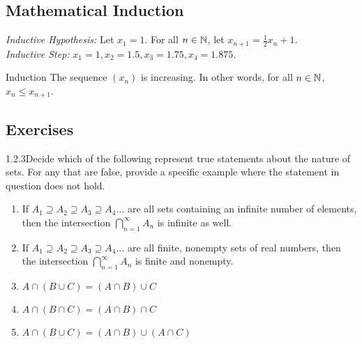 \subsection{Mathematical Induction} \hfill

\textit{Inductive Hypothesis:} Let $x_1 = 1$. For all $n \in \mathbb{N}$, let $x_{n+1} = \frac{1}{2}x_n + 1$. \\

\textit{Inductive Step:} $x_1 = 1, x_2 = 1.5, x_3 = 1.75, x_4 = 1.875$. \\

\begin{example}
    {Induction} The sequence $(x_n)$ is increasing. In other words, for all $n\in \mathbb{N}$, $x_n \leq x_{n+1}$. 
\end{example}


\subsection*{Exercises}

\begin{exercise}
    {1.2.3}Decide which of the following represent true statements about
the nature of sets. For any that are false, provide a specific example where the
statement in question does not hold.
\begin{enumerate}
    \item If $A_1 \supseteq A_2 \supseteq A_3 \supseteq A_4\dots$ are all sets containing an infinite number of
elements, then the intersection $\bigcap^\infty_{n=1} A_n$ is infinite as well.
    \item If $A_1 \supseteq A_2 \supseteq A_3 \supseteq A_4\dots$ are all finite, nonempty sets of real numbers,
then the intersection $\bigcap^\infty_{n=1} A_n$ is finite and nonempty.
    \item $A \cap (B \cup C) = (A \cap B) \cup C$
    \item $A \cap (B \cap C) = (A \cap B) \cap C$
    \item $A \cap (B \cup C) = (A \cap B) \cup (A \cap C)$
\end{enumerate}
\end{exercise}


